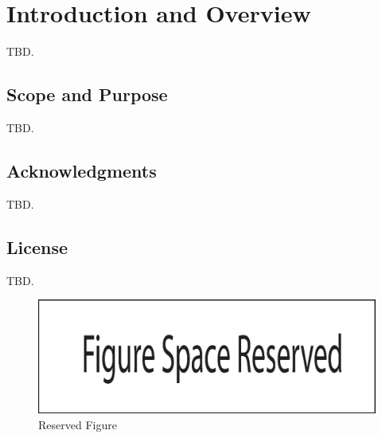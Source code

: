 \section{Introduction and Overview}
\label{siov0}

TBD.


\subsection{Scope and Purpose}
\label{siov0:sspu0}

TBD.


\subsection{Acknowledgments}
\label{siov0:sack0}

TBD.


\subsection{License}
\label{siov0:slic0}

TBD.


\begin{figure}
\centering
\includegraphics[width=4.6in]{common/figure_reserved.eps}
\caption{Reserved Figure}
\label{fig:siov0:01}
\end{figure}


